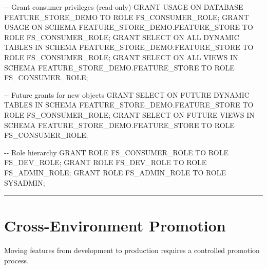 \documentclass[
  letterpaper,
  DIV=11,
  numbers=noendperiod]{scrreprt}
\newenvironment{Shaded}{\begin{snugshade}}{\end{snugshade}}
\newcommand{\CommentTok}[1]{\textcolor[rgb]{0.37,0.37,0.37}{#1}}
\newcommand{\KeywordTok}[1]{\textcolor[rgb]{0.00,0.23,0.31}{#1}}
\newcommand{\NormalTok}[1]{\textcolor[rgb]{0.00,0.23,0.31}{#1}}
\begin{document}
\begin{Shaded}
\begin{Highlighting}[]
\CommentTok{{-}{-} Grant consumer privileges (read{-}only)}
\KeywordTok{GRANT} \KeywordTok{USAGE} \KeywordTok{ON} \KeywordTok{DATABASE}\NormalTok{ FEATURE\_STORE\_DEMO }\KeywordTok{TO} \KeywordTok{ROLE}\NormalTok{ FS\_CONSUMER\_ROLE;}
\KeywordTok{GRANT} \KeywordTok{USAGE} \KeywordTok{ON} \KeywordTok{SCHEMA}\NormalTok{ FEATURE\_STORE\_DEMO.FEATURE\_STORE }\KeywordTok{TO} \KeywordTok{ROLE}\NormalTok{ FS\_CONSUMER\_ROLE;}
\KeywordTok{GRANT} \KeywordTok{SELECT} \KeywordTok{ON} \KeywordTok{ALL} \KeywordTok{DYNAMIC} \KeywordTok{TABLES} \KeywordTok{IN} \KeywordTok{SCHEMA}\NormalTok{ FEATURE\_STORE\_DEMO.FEATURE\_STORE }\KeywordTok{TO} \KeywordTok{ROLE}\NormalTok{ FS\_CONSUMER\_ROLE;}
\KeywordTok{GRANT} \KeywordTok{SELECT} \KeywordTok{ON} \KeywordTok{ALL}\NormalTok{ VIEWS }\KeywordTok{IN} \KeywordTok{SCHEMA}\NormalTok{ FEATURE\_STORE\_DEMO.FEATURE\_STORE }\KeywordTok{TO} \KeywordTok{ROLE}\NormalTok{ FS\_CONSUMER\_ROLE;}

\CommentTok{{-}{-} Future grants for new objects}
\KeywordTok{GRANT} \KeywordTok{SELECT} \KeywordTok{ON}\NormalTok{ FUTURE }\KeywordTok{DYNAMIC} \KeywordTok{TABLES} \KeywordTok{IN} \KeywordTok{SCHEMA}\NormalTok{ FEATURE\_STORE\_DEMO.FEATURE\_STORE }\KeywordTok{TO} \KeywordTok{ROLE}\NormalTok{ FS\_CONSUMER\_ROLE;}
\KeywordTok{GRANT} \KeywordTok{SELECT} \KeywordTok{ON}\NormalTok{ FUTURE VIEWS }\KeywordTok{IN} \KeywordTok{SCHEMA}\NormalTok{ FEATURE\_STORE\_DEMO.FEATURE\_STORE }\KeywordTok{TO} \KeywordTok{ROLE}\NormalTok{ FS\_CONSUMER\_ROLE;}

\CommentTok{{-}{-} Role hierarchy}
\KeywordTok{GRANT} \KeywordTok{ROLE}\NormalTok{ FS\_CONSUMER\_ROLE }\KeywordTok{TO} \KeywordTok{ROLE}\NormalTok{ FS\_DEV\_ROLE;}
\KeywordTok{GRANT} \KeywordTok{ROLE}\NormalTok{ FS\_DEV\_ROLE }\KeywordTok{TO} \KeywordTok{ROLE}\NormalTok{ FS\_ADMIN\_ROLE;}
\KeywordTok{GRANT} \KeywordTok{ROLE}\NormalTok{ FS\_ADMIN\_ROLE }\KeywordTok{TO} \KeywordTok{ROLE}\NormalTok{ SYSADMIN;}
\end{Highlighting}
\end{Shaded}

\begin{center}\rule{0.5\linewidth}{0.5pt}\end{center}

\hypertarget{sec-promotion}{%
\section{Cross-Environment Promotion}\label{sec-promotion}}

Moving features from development to production requires a controlled
promotion process.
\end{document}
